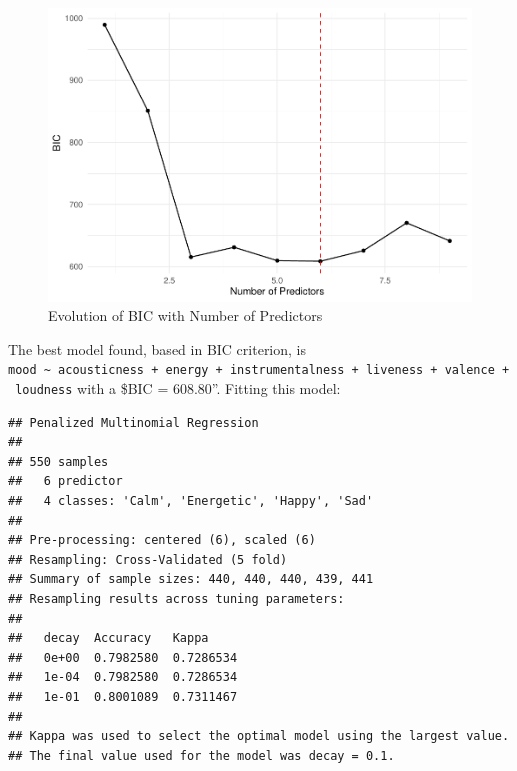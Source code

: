 \documentclass[11pt,]{article}
\begin{document}
\begin{figure}[H]
\includegraphics{figs/BIC} \caption{Evolution of BIC with Number of Predictors}\label{fig:BIC}
\end{figure}

The best model found, based in BIC criterion, is
\texttt{mood\ \textasciitilde{}\ acousticness\ +\ energy\ +\ instrumentalness\ +\ liveness\ +\ valence\ +\ loudness}
with a \$BIC = 608.80''. Fitting this model:

\begin{verbatim}
## Penalized Multinomial Regression 
## 
## 550 samples
##   6 predictor
##   4 classes: 'Calm', 'Energetic', 'Happy', 'Sad' 
## 
## Pre-processing: centered (6), scaled (6) 
## Resampling: Cross-Validated (5 fold) 
## Summary of sample sizes: 440, 440, 440, 439, 441 
## Resampling results across tuning parameters:
## 
##   decay  Accuracy   Kappa    
##   0e+00  0.7982580  0.7286534
##   1e-04  0.7982580  0.7286534
##   1e-01  0.8001089  0.7311467
## 
## Kappa was used to select the optimal model using the largest value.
## The final value used for the model was decay = 0.1.
\end{verbatim}
\end{document}
